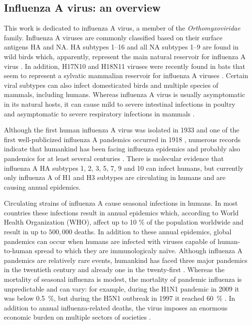 \subsection{Influenza A virus: an overview}
	
	This work is dedicated to influenza A virus, a member of the \textit{Orthomyxoviridae} family. Influenza A viruses are commonly classified based on their surface antigens \gls{HA} and \gls{NA}. \gls{HA} subtypes 1--16 and all \gls{NA} subtypes 1--9 are found in wild birds which, apparently, represent the main natural reservoir for influenza A virus \parencite{Stallknecht2007}. In addition, H17N10 and H18N11 viruses were recently found in bats that seem to represent a sylvatic mammalian reservoir for influenza A viruses \parencite{Tong2012, Tong2013}. Certain viral subtypes can also infect domesticated birds and multiple species of mammals, including humans. Whereas influenza A virus is usually asymptomatic in its natural hosts, it can cause mild to severe intestinal infections in poultry and asymptomatic to severe respiratory infections in mammals \parencite{Webster1992}. 
	
	Although the first human influenza A virus was isolated in 1933 \parencite{Smith1933} and one of the first well-publicized influenza A pandemics occurred in 1918 \parencite{Taubenberger1997}, numerous records indicate that humankind has been facing influenza epidemics and probably also pandemics for at least several centuries \parencite{Potter2001}. There is molecular evidence that influenza A \gls{HA} subtypes 1, 2, 3, 5, 7, 9 and 10 can infect humans, but currently only influenza A of H1 and H3 subtypes are circulating in humans and are causing annual epidemics.
	
	Circulating strains of influenza A cause seasonal infections in humans. In most countries these infections result in annual epidemics which, according to World Health Organization (WHO), affect up to 10 \% of the population worldwide and result in up to $500,000$ deaths. In addition to these annual epidemics, global pandemics can occur when humans are infected with viruses capable of human-to-human spread to which they are immunologicaly na\"{i}ve. Although influenza A pandemics are relatively rare events, humankind has faced three major pandemics in the twentieth century and already one in the twenty-first \parencite{Lagace-Wiens2010, Fineberg2014}.  Whereas the mortality of seasonal influenza is modest, the mortality of pandemic influenza is unpredictable and can vary: for example, during the H1N1 pandemic in 2009 it was below 0.5~\%, but during the H5N1 outbreak in 1997 it reached 60~\% \parencite{Forrest2010, Noah2013}. In addition to annual influenza-related deaths, the virus imposes an enormous economic burden on multiple sectors of societies \parencite{Szucs1999, Noah2013}. 
	
